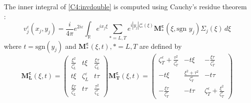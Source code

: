 \hspace*{2em} The inner integral of \eqref{C4:invdouble} is computed using Cauchy's residue theorem :
\begin{equation}
v_j^{\varepsilon}(x_j,y_j)=\frac{i}{4\pi}e^{2i\varepsilon}\int_{\mathbb{R}} e^{ix_j\xi}\sum_{*=L,T}e^{i|y_j|\zeta_*^{\varepsilon}(\xi)}\mathbf{M_*^{\varepsilon}}(\xi,\mbox{sgn }y_j)\Sigma_j(\xi)\,d\xi
\label{C4:vjeps}
\end{equation}
where $t=\mbox{sgn}( y_j)$ and $\mathbf{M_*^{\varepsilon}}(\xi,t), *=L,T$ are defined by
\begin{subequations}
\begin{equation}
\mathbf{M_L^{\varepsilon}}(\xi,t)=\begin{pmatrix}
\frac{\xi^2}{\zeta_L^{\varepsilon}} &t\xi & \frac{\xi\tau}{\zeta_L^{\varepsilon}} \\
t\xi & \zeta_L^{\varepsilon} & t\tau \\
\frac{\xi\tau}{\zeta_L^{\varepsilon}}& t\tau & \frac{\tau^2}{\zeta_L^{\varepsilon}}
\end{pmatrix}
\label{C4:MLeps}
\end{equation}
\begin{equation}
\mathbf{M_T^{\varepsilon}}(\xi,t)=\begin{pmatrix}
\zeta_T^{\varepsilon} +\frac{\tau^2}{\zeta_T^{\varepsilon}}& -t\xi &-\frac{\xi\tau}{\zeta_T^{\varepsilon}}\\
-t\xi & \frac{\xi^2+\tau^2}{\zeta_T^{\varepsilon}}&-t\tau \\
-\frac{\xi\tau}{\zeta_T^{\varepsilon}}&-t\tau&\zeta_T^{\varepsilon} +\frac{\xi^2}{\zeta_T^{\varepsilon}}
\end{pmatrix}
\label{C4:MTeps}
\end{equation}
\label{C4:M*eps}
\end{subequations}

